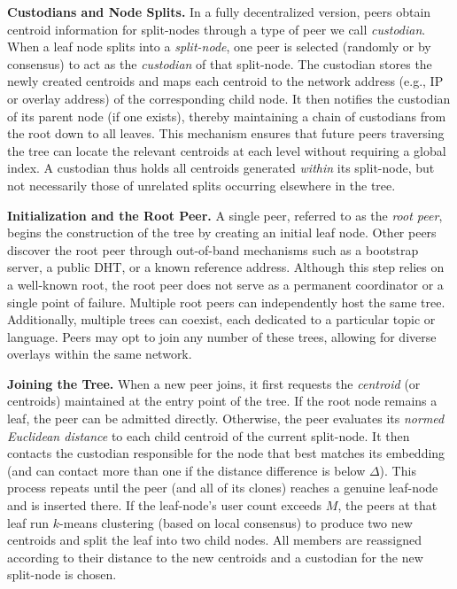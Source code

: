 \documentclass[10pt,journal]{IEEEtran}
\begin{document}
\textbf{Custodians and Node Splits.}
In a fully decentralized version, peers obtain centroid information for split-nodes through a type of peer we call \emph{custodian}.
When a leaf node splits into a \emph{split-node}, one peer is selected (randomly or by consensus) to act as the \emph{custodian} of that split-node. The custodian stores the newly created centroids and maps each centroid to the network address (e.g., IP or overlay address) of the corresponding child node. It then notifies the custodian of its parent node (if one exists), thereby maintaining a chain of custodians from the root down to all leaves. This mechanism ensures that future peers traversing the tree can locate the relevant centroids at each level without requiring a global index. A custodian thus holds all centroids generated \emph{within} its split-node, but not necessarily those of unrelated splits occurring elsewhere in the tree.


\textbf{Initialization and the Root Peer.}
A single peer, referred to as the \emph{root peer}, begins the construction of the tree by creating an initial leaf node. Other peers discover the root peer through out-of-band mechanisms such as a bootstrap server, a public DHT, or a known reference address. Although this step relies on a well-known root, the root peer does not serve as a permanent coordinator or a single point of failure. Multiple root peers can independently host the same tree. Additionally, multiple trees can coexist, each dedicated to a particular topic or language. Peers may opt to join any number of these trees, allowing for diverse overlays within the same network.

\textbf{Joining the Tree.}
When a new peer joins, it first requests the \emph{centroid} (or centroids) maintained at the entry point of the tree. If the root node remains a leaf, the peer can be admitted directly. Otherwise, the peer evaluates its \emph{normed Euclidean distance} to each child centroid of the current split-node. It then contacts the custodian responsible for the node that best matches its embedding (and can contact more than one if the distance difference is below $\Delta$). This process repeats until the peer (and all of its clones) reaches a genuine leaf-node and is inserted there. If the leaf-node’s user count exceeds $M$, the peers at that leaf run $k$-means clustering (based on local consensus) to produce two new centroids and split the leaf into two child nodes. All members are reassigned according to their distance to the new centroids and a custodian for the new split-node is chosen.
\end{document}
